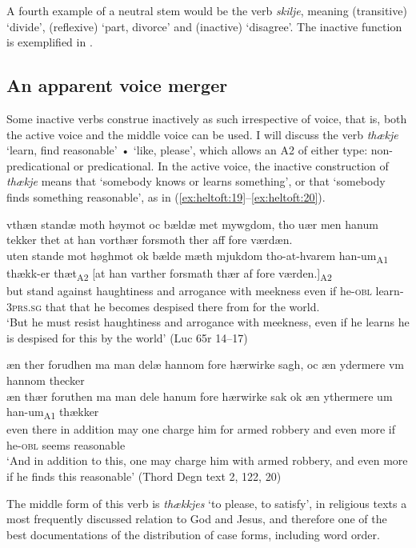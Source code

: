 \documentclass[output=paper]{langscibook}
\begin{document}
A fourth example of a neutral stem would be the verb \textit{skilje}, meaning (transitive) ‘divide', (reflexive) ‘part, divorce' and (inactive) ‘disagree'. The inactive function is exemplified in .

\subsection{An apparent voice merger} \label{heltoft:2.4}
Some inactive verbs construe inactively as such irrespective of voice, that is, both the active voice and the middle voice can be used. I will discuss the verb \textit{thækje} ‘learn, find reasonable' • ‘like, please', which allows an A2 of either type: non-predicational or predicational. In the active voice, the inactive construction of \textit{thækje} means that ‘somebody knows or learns something', or that ‘somebody finds something reasonable', as in (\ref{ex:heltoft:19}--\ref{ex:heltoft:20}).


\ea \label{ex:heltoft:19}
    \glll vthæn standæ moth høymot oc bældæ met mywgdom, {tho uær men} hanum tekker thet at han vorthær forsmoth ther aff fore værdæn.\\
           uten stande mot høghmot ok bælde mæth mjukdom tho-at-hvarem han-um\textsubscript{A1} thækk-er  thæt\textsubscript{A2} [at han varther forsmath thær af fore værden.]\textsubscript{A2}\\
         but    stand against haughtiness and arrogance with meekness {even if} he-\textsc{obl}    learn-\textsc{3prs.sg}   that   that he becomes despised  there from for {the world}.\\
    \glt ‘But he must resist haughtiness and arrogance with meekness, even if he learns he is despised for this by the world' (Luc 65r 14--17)

\ex \label{ex:heltoft:20}
    \glll æn ther forudhen   ma man delæ hannom fore hærwirke sagh, oc   æn   ydermere vm hannom thecker \\
     æn    thær  foruthen    ma  man  dele  hanum    fore hærwirke sak ok    æn    ythermere  um    han-um\textsubscript{A1}  thækker  \\
     even   there   {in addition}  may one  charge him     for armed robbery and  even   more    if    he-\textsc{obl}    {seems reasonable}\\
    \glt `And in addition to this, one may charge him with armed robbery, and even more if he finds this reasonable' (Thord Degn text 2, 122, 20)
\z
  
The middle form of this verb is \textit{thækkjes} ‘to please, to satisfy', in religious texts a most frequently discussed relation to God and Jesus, and therefore one of the best documentations of the distribution of case forms, including word order. 
\end{document}

